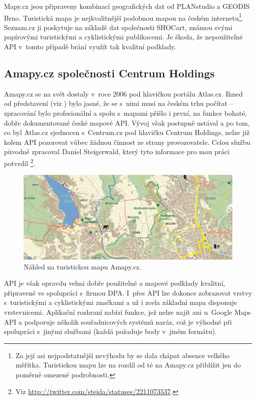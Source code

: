 Mapy.cz jsou připraveny kombinací geografických dat od PLANstudio a
GEODIS Brno. Turistická mapa je nej\-kvalitnější podobnou mapou na českém
internetu\footnote{Za její asi nej\-podstatnější nevýhodu by se dala
chápat absence velkého měřítka. Turistickou mapu lze na rozdíl od té
na Amapy.cz přiblížit jen do poměrně omezené podrobnosti.}. Seznam.cz
ji poskytuje na základě dat společnosti SHOCart, známou svými
papírovými turistickými a cyklistickými publikacemi. Je škoda, že
nepoužitelné API v~tomto případě brání využít tak kvalitní podklady.

\subsection{Amapy.cz společnosti Centrum Holdings}
Amapy.cz se na svět dostaly v~roce 2006 pod hlavičkou portálu
Atlas.cz. Ihned od představení (viz \cite{amapy}) bylo jasné, že se
s~nimi musí na českém trhu počítat -- zpracování bylo profesionální a spolu s~mapami přišlo
i první, na funkce bohaté, dobře dokumentované české mapové API. Vývoj
však postupně ustával a po tom, co byl Atlas.cz sjednocen
s~Centrum.cz pod hlavičku Centrum Holdings, nelze již kolem API
pozorovat vůbec žádnou činnost ze strany provozovatele. Celou službu
původně zpracoval Daniel Steigerwald, který tyto informace pro mou
práci potvrdil
\footnote{Viz \url{http://twitter.com/steida/statuses/2211073537}.}.

\begin{figure}[h]
	\includegraphics[width=\textwidth, keepaspectratio]{fig/mapacentrum}
	\caption{Náhled na turistickou mapu Amapy.cz.}
	\label{obrCentrumMap}
\end{figure}

API je však opravdu velmi dobře použitelné a mapové podklady
kvalitní, připravené ve spolupráci s~firmou DPA. I~přes API lze
dokonce zobrazovat vrstvy s~turistickými a cyklistickými značkami a už i
zcela základní mapa disponuje vrstevnicemi. Aplikační rozhraní nabízí
funkce, jež nelze najít ani u~Google Maps API a podporuje několik
souřadnicových systémů naráz, což je výhodné při spolupráci s~jinými
službami (každá požaduje body v~jiném formátu).

